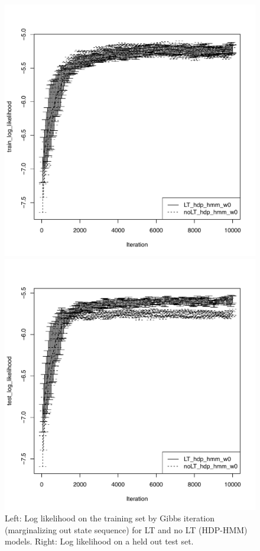 \begin{figure}
\begin{minipage}{0.45\textwidth}
\includegraphics[width=\textwidth]{fig/block_diag/train_log_likelihood}
\end{minipage}
\hspace{0.1in}
\begin{minipage}{0.45\textwidth}
\includegraphics[width=\textwidth]{fig/block_diag/test_log_likelihood}
\end{minipage}
\caption{Left: Log likelihood on the training set by Gibbs iteration
  (marginalizing out state sequence) for LT and no LT (HDP-HMM)
  models.  Right: Log likelihood on a held out test set.}
\end{figure}

